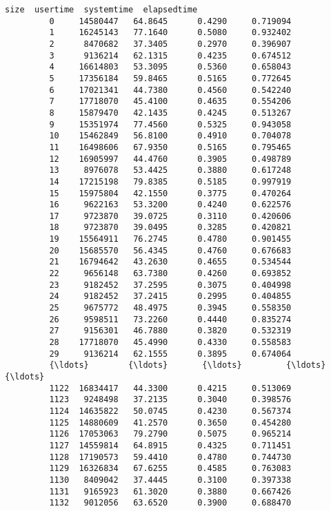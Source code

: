 \documentclass[11pt]{article}
\begin{document}
\begin{Verbatim}[commandchars=\\\{\}]
                   size  usertime  systemtime  elapsedtime  
         0     14580447   64.8645      0.4290     0.719094  
         1     16245143   77.1640      0.5080     0.932402  
         2      8470682   37.3405      0.2970     0.396907  
         3      9136214   62.1315      0.4235     0.674512  
         4     16614803   53.3095      0.5360     0.658043  
         5     17356184   59.8465      0.5165     0.772645  
         6     17021341   44.7380      0.4560     0.542240  
         7     17718070   45.4100      0.4635     0.554206  
         8     15879470   42.1435      0.4245     0.513267  
         9     15351974   77.4560      0.5325     0.943058  
         10    15462849   56.8100      0.4910     0.704078  
         11    16498606   67.9350      0.5165     0.795465  
         12    16905997   44.4760      0.3905     0.498789  
         13     8976078   53.4425      0.3880     0.617248  
         14    17215198   79.8385      0.5185     0.997919  
         15    15975804   42.1550      0.3775     0.470264  
         16     9622163   53.3200      0.4240     0.622576  
         17     9723870   39.0725      0.3110     0.420606  
         18     9723870   39.0495      0.3285     0.420821  
         19    15564911   76.2745      0.4780     0.901455  
         20    15685570   56.4345      0.4760     0.676683  
         21    16794642   43.2630      0.4655     0.534544  
         22     9656148   63.7380      0.4260     0.693852  
         23     9182452   37.2595      0.3075     0.404998  
         24     9182452   37.2415      0.2995     0.404855  
         25     9675772   48.4975      0.3945     0.558350  
         26     9598511   73.2260      0.4440     0.835274  
         27     9156301   46.7880      0.3820     0.532319  
         28    17718070   45.4990      0.4330     0.558583  
         29     9136214   62.1555      0.3895     0.674064  
         {\ldots}        {\ldots}       {\ldots}         {\ldots}          {\ldots}  
         1122  16834417   44.3300      0.4215     0.513069  
         1123   9248498   37.2135      0.3040     0.398576  
         1124  14635822   50.0745      0.4230     0.567374  
         1125  14880609   41.2570      0.3650     0.454280  
         1126  17053063   79.2790      0.5075     0.965214  
         1127  14559814   64.8915      0.4325     0.711451  
         1128  17190573   59.4410      0.4780     0.744730  
         1129  16326834   67.6255      0.4585     0.763083  
         1130   8409042   37.4445      0.3100     0.397338  
         1131   9165923   61.3020      0.3880     0.667426  
         1132   9012056   63.6520      0.3900     0.688470  

\end{Verbatim}
\end{document}
